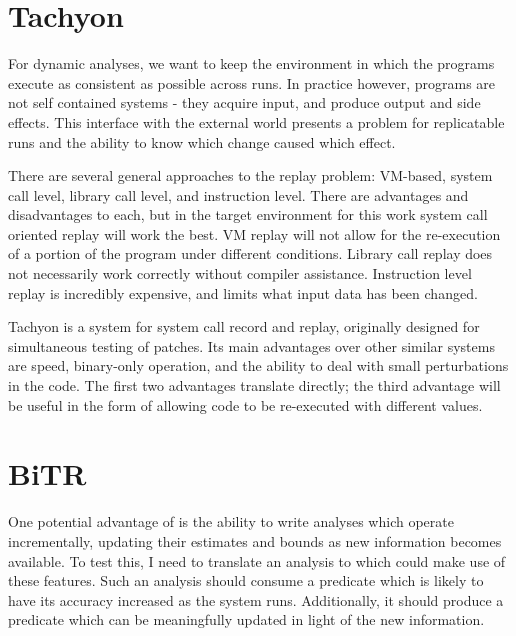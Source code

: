 \section{Tachyon}
For dynamic analyses, we want to keep the environment in which the programs execute as consistent as possible across runs.
In practice however, programs are not self contained systems - they acquire input, and produce output and side effects.
This interface with the external world presents a problem for replicatable runs and the ability to know which change caused which effect.

There are several general approaches to the replay problem: VM-based, system call level, library call level, and instruction level.
There are advantages and disadvantages to each, but in the target environment for this work system call oriented replay will work the best.
VM replay will not allow for the re-execution of a portion of the program under different conditions.
Library call replay does not necessarily work correctly without compiler assistance.
Instruction level replay is incredibly expensive, and limits what input data has been changed.

Tachyon\cite{tachyon} is a system for system call record and replay, originally designed for simultaneous testing of patches.
Its main advantages over other similar systems are speed, binary-only operation, and the ability to deal with small perturbations in the code.
The first two advantages translate directly;
the third advantage will be useful in the form of allowing code to be re-executed with different values.

\section{BiTR}
One potential advantage of \sysname is the ability to write analyses which operate incrementally, updating their estimates and bounds as new information becomes available.
To test this, I need to translate an analysis to \sysname which could make use of these features.
Such an analysis should consume a predicate which is likely to have its accuracy increased as the system runs.
Additionally, it should produce a predicate which can be meaningfully updated in light of the new information.

